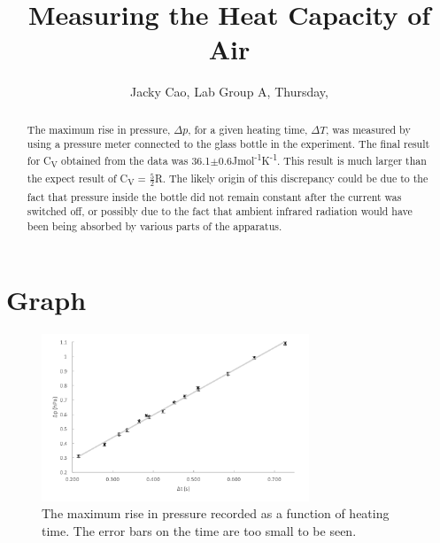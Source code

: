 \documentclass[twocolumn]{revtex4}
\begin{document}
\textheight=24.75cm

\title{Measuring the Heat Capacity of Air} 
 
 
\author{Jacky Cao, Lab Group A, Thursday,}


\begin{abstract}              
 
 
The maximum rise in pressure, $\Delta p$, for a given heating time, $\Delta T$, was measured by using a pressure meter connected to the glass bottle in the experiment. The final result for C\textsubscript{V} obtained from the data was 36.1$\pm0.6$Jmol\textsuperscript{-1}K\textsuperscript{-1}. This result is much larger than the expect result of C\textsubscript{V} = $\frac{5}{2}$R. The likely origin of this discrepancy could be due to the fact that pressure inside the bottle did not remain constant after the current was switched off, or possibly due to the fact that ambient infrared radiation would have been being absorbed by various parts of the apparatus. 

\end{abstract}

\maketitle

\section{Graph} 
\vspace{-2ex} 
 
\begin{figure}[!h]
\begin{center}
\includegraphics[width=8cm]{fig1}
\caption[]{The maximum rise in pressure recorded as a function of heating time. The error bars on the time are too small to be seen.}
\label{fig:fig1}
\end{center}
\end{figure}


\vspace{-3ex}
\end{document}
